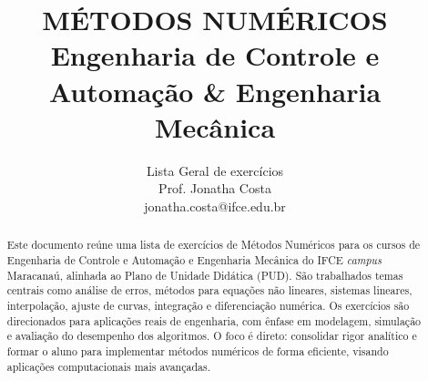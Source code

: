 \documentclass[12pt]{elsarticle}
\begin{document}
	
\begin{frontmatter}
	\title{\bf MÉTODOS NUMÉRICOS\\
	\textnormal{\normalsize Engenharia de Controle e Automação \& Engenharia Mecânica}
}
\author{
\vspace{-0.5cm}
\textnormal{
 	Lista Geral de exercícios\\
	Prof. Jonatha Costa\\
	jonatha.costa@ifce.edu.br}
}
	\begin{abstract} 
Este documento reúne uma lista de exercícios de Métodos Numéricos para os cursos de Engenharia de Controle e Automação e Engenharia Mecânica do IFCE \textit{campus} Maracanaú,
alinhada ao Plano de Unidade Didática (PUD). São trabalhados temas centrais como análise de erros, métodos para equações não lineares, sistemas lineares, interpolação,
ajuste de curvas, integração e diferenciação numérica. Os exercícios são direcionados para aplicações reais de engenharia, com ênfase em modelagem,
simulação e avaliação do desempenho dos algoritmos. O foco é direto: consolidar rigor analítico e formar o aluno para implementar métodos numéricos de forma eficiente, 
visando aplicações computacionais mais avançadas.	
\end{abstract}
	
\end{frontmatter}
	
\end{document}
